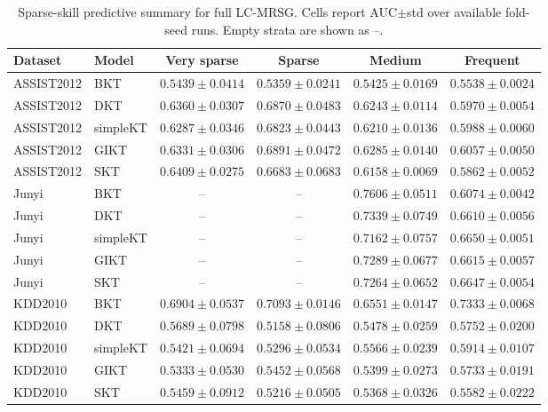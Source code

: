 \documentclass[11pt,a4paper]{article}
\newcommand{\LCMRSG}{LC-MRSG}
\begin{document}
\begin{table}[H]
\centering
\caption{Sparse-skill predictive summary for full \LCMRSG{}. Cells report AUC$\pm$std over available fold-seed runs. Empty strata are shown as --.}
\label{tab:sparse}
\scriptsize
\begin{tabular}{llcccc}
\toprule
Dataset & Model & Very sparse & Sparse & Medium & Frequent \\
\midrule
ASSIST2012 & BKT & $0.5439\pm0.0414$ & $0.5359\pm0.0241$ & $0.5425\pm0.0169$ & $0.5538\pm0.0024$ \\
ASSIST2012 & DKT & $0.6360\pm0.0307$ & $0.6870\pm0.0483$ & $0.6243\pm0.0114$ & $0.5970\pm0.0054$ \\
ASSIST2012 & simpleKT & $0.6287\pm0.0346$ & $0.6823\pm0.0443$ & $0.6210\pm0.0136$ & $0.5988\pm0.0060$ \\
ASSIST2012 & GIKT & $0.6331\pm0.0306$ & $0.6891\pm0.0472$ & $0.6285\pm0.0140$ & $0.6057\pm0.0050$ \\
ASSIST2012 & SKT & $0.6409\pm0.0275$ & $0.6683\pm0.0683$ & $0.6158\pm0.0069$ & $0.5862\pm0.0052$ \\
Junyi & BKT & -- & -- & $0.7606\pm0.0511$ & $0.6074\pm0.0042$ \\
Junyi & DKT & -- & -- & $0.7339\pm0.0749$ & $0.6610\pm0.0056$ \\
Junyi & simpleKT & -- & -- & $0.7162\pm0.0757$ & $0.6650\pm0.0051$ \\
Junyi & GIKT & -- & -- & $0.7289\pm0.0677$ & $0.6615\pm0.0057$ \\
Junyi & SKT & -- & -- & $0.7264\pm0.0652$ & $0.6647\pm0.0054$ \\
KDD2010 & BKT & $0.6904\pm0.0537$ & $0.7093\pm0.0146$ & $0.6551\pm0.0147$ & $0.7333\pm0.0068$ \\
KDD2010 & DKT & $0.5689\pm0.0798$ & $0.5158\pm0.0806$ & $0.5478\pm0.0259$ & $0.5752\pm0.0200$ \\
KDD2010 & simpleKT & $0.5421\pm0.0694$ & $0.5296\pm0.0534$ & $0.5566\pm0.0239$ & $0.5914\pm0.0107$ \\
KDD2010 & GIKT & $0.5333\pm0.0530$ & $0.5452\pm0.0568$ & $0.5399\pm0.0273$ & $0.5733\pm0.0191$ \\
KDD2010 & SKT & $0.5459\pm0.0912$ & $0.5216\pm0.0505$ & $0.5368\pm0.0326$ & $0.5582\pm0.0222$ \\
\bottomrule
\end{tabular}
\end{table}
\end{document}
